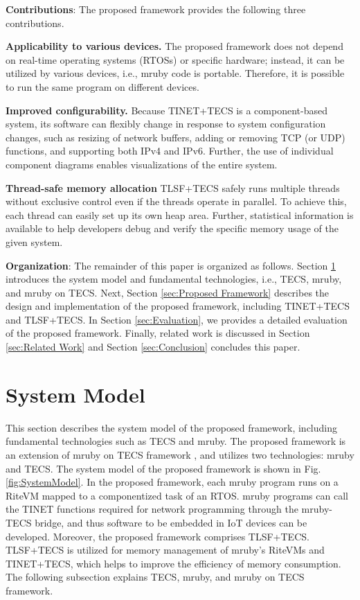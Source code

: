 \documentclass[JIP]{ipsj_v2/UTF8/ipsj}
\begin{document}
{\bf Contributions}: The proposed framework provides the following three contributions.

{\bf Applicability to various devices.}
The proposed framework does not depend on real-time operating systems (RTOSs) or specific hardware; instead, it can be utilized by various devices, i.e., mruby code is portable.
Therefore, it is possible to run the same program on different devices.

{\bf Improved configurability.}
Because TINET+TECS is a component-based system, its software can flexibly change in response to system configuration changes, such as resizing of network buffers, adding or removing TCP (or UDP) functions, and supporting both IPv4 and IPv6.
Further, the use of individual component diagrams enables visualizations of the entire system.

{\bf Thread-safe memory allocation}
TLSF+TECS safely runs multiple threads without exclusive control even if the threads operate in parallel.
To achieve this, each thread can easily set up its own heap area.
Further, statistical information is available to help developers debug and verify the specific memory usage of the given system.

{\bf Organization}: The remainder of this paper is organized as follows.
Section \ref{sec:System Model} introduces the system model and fundamental technologies, i.e., TECS, mruby, and mruby on TECS.
Next, Section \ref{sec:Proposed Framework} describes the design and implementation of the proposed framework, including TINET+TECS and TLSF+TECS.
In Section \ref{sec:Evaluation}, we provides a detailed evaluation of the proposed framework.
Finally, related work is discussed in Section \ref{sec:Related Work} and Section \ref{sec:Conclusion} concludes this paper.


\section{System Model}
\label{sec:System Model}

This section describes the system model of the proposed framework, including fundamental technologies such as TECS and mruby.
The proposed framework is an extension of mruby on TECS framework \cite{par:mrubyonTECS}\cite{par:mrubyonTECS3}, and utilizes two technologies: mruby and TECS.
The system model of the proposed framework is shown in Fig.\ref{fig:SystemModel}.
In the proposed framework, each mruby program runs on a RiteVM mapped to a componentized task of an RTOS.
mruby programs can call the TINET functions required for network programming through the mruby-TECS bridge, and thus software to be embedded in IoT devices can be developed.
Moreover, the proposed framework comprises TLSF+TECS.
TLSF+TECS is utilized for memory management of mruby's RiteVMs and TINET+TECS, which helps to improve the efficiency of memory consumption.
The following subsection explains TECS, mruby, and mruby on TECS framework.
\end{document}
